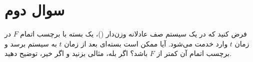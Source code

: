 \section{سوال دوم}

فرض کنید که در یک سیستم صف عادلانه وزن‌دار ()، یک بسته با برچسب اتمام $F$  در زمان $t$ وارد خدمت می‌شود. آیا ممکن است بسته‌ای بعد از زمان $t$ به سیستم برسد و برچسب اتمام آن کمتر از $F$ باشد؟ اگر بله، مثالی بزنید و اگر خیر، توضیح دهید.